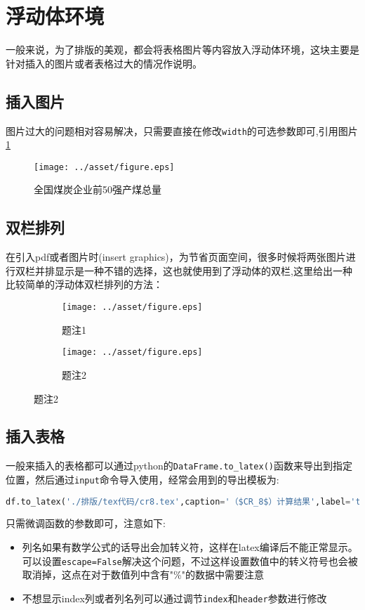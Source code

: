 \documentclass[withoutpreface,bwprint]{cumcmthesis} %
\begin{document}
\section{浮动体环境}
一般来说，为了排版的美观，都会将表格图片等内容放入浮动体环境，这块主要是针对插入的图片或者表格过大的情况作说明。
\subsection{插入图片}
图片过大的问题相对容易解决，只需要直接在修改\verb|width|的可选参数即可,引用图片\ref{sum_production}
\begin{figure}[H]%
  \small
  \centering
  \texttt{[image: ../asset/figure.eps]}
  \caption{全国煤炭企业前50强产煤总量}\label{sum_production}
\end{figure}
\subsection{双栏排列}\label{双栏}
在引入pdf或者图片时(insert graphics)，为节省页面空间，很多时候将两张图片进行双栏并排显示是一种不错的选择，这也就使用到了浮动体的双栏,这里给出一种比较简单的浮动体双栏排列的方法：
\begin{figure}[H]
  \caption{两个图并排放置}\label{sub_cap}
  \centering
  \begin{subfigure}{0.45\textwidth}
    \texttt{[image: ../asset/figure.eps]}
    \caption{题注1}
  \end{subfigure}
  \begin{subfigure}{0.45\textwidth}
    \texttt{[image: ../asset/figure.eps]}
    \caption{题注2}
  \end{subfigure}
\end{figure}
\subsection{插入表格}
一般来插入的表格都可以通过python的\verb|DataFrame.to_latex()|函数来导出到指定位置，然后通过\verb|input|命令导入使用，经常会用到的导出模板为:
\begin{lstlisting}[language=python]
df.to_latex('./排版/tex代码/cr8.tex',caption='（$CR_8$）计算结果',label='table',header=False)
\end{lstlisting}
只需微调函数的参数即可，注意如下:
\begin{itemize}
  \item 列名如果有数学公式的话导出会加转义符，这样在latex编译后不能正常显示。可以设置\verb|escape=False|解决这个问题，不过这样设置数值中的转义符号也会被取消掉，这点在对于数值列中含有"\%"的数据中需要注意
  \item 不想显示index列或者列名列可以通过调节\verb|index|和\verb|header|参数进行修改
\end{itemize}
\end{document}
